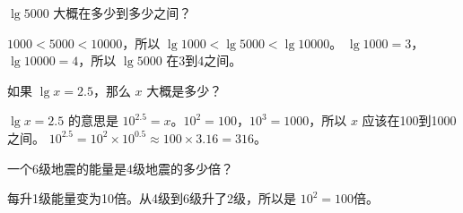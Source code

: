 \begin{example}
$\lg 5000$ 大概在多少到多少之间？
\end{example}
\begin{solution}
$1000 < 5000 < 10000$，所以 $\lg 1000 < \lg 5000 < \lg 10000$。
$\lg 1000 = 3$，$\lg 10000 = 4$，所以 $\lg 5000$ 在3到4之间。
\end{solution}

\begin{example}
如果 $\lg x = 2.5$，那么 $x$ 大概是多少？
\end{example}
\begin{solution}
$\lg x = 2.5$ 的意思是 $10^{2.5} = x$。$10^2 = 100$，$10^3 = 1000$，所以 $x$ 应该在100到1000之间。
$10^{2.5} = 10^{2} \times 10^{0.5} \approx 100 \times 3.16 = 316$。
\end{solution}

\begin{example}
一个6级地震的能量是4级地震的多少倍？
\end{example}
\begin{solution}
每升1级能量变为10倍。从4级到6级升了2级，所以是 $10^2 = 100$倍。
\end{solution}

